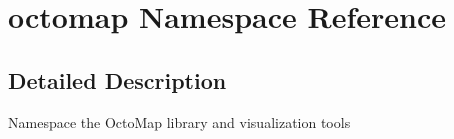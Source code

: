 \hypertarget{namespaceoctomap}{\section{octomap Namespace Reference}
\label{namespaceoctomap}
}


\subsection{Detailed Description}
Namespace the Octo\+Map library and visualization tools 